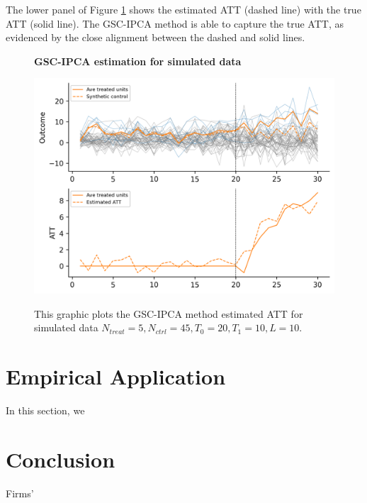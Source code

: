 \documentclass[12pt]{article}
\begin{document}
The lower panel of Figure \ref{fig: sim} shows the estimated ATT (dashed line) with the true ATT (solid line). The GSC-IPCA method is able to capture the true ATT, as evidenced by the close alignment between the dashed and solid lines.

\begin{figure}[!ht]
\centering
\caption{\textbf{GSC-IPCA estimation for simulated data}}
\includegraphics{figs/simulation.png}
\label{fig: sim}
\caption*{\footnotesize{This graphic plots the GSC-IPCA method estimated ATT for simulated data $N_{treat} = 5, N_{ctrl} = 45, T_0=20, T_1=10, L=10$.}}
\end{figure}

\section{Empirical Application}
\label{sec: application}

In this section, we
\section{Conclusion} 
\label{sec: conclusion}

Firms' 

\begingroup
{}


\endgroup
\end{document}
